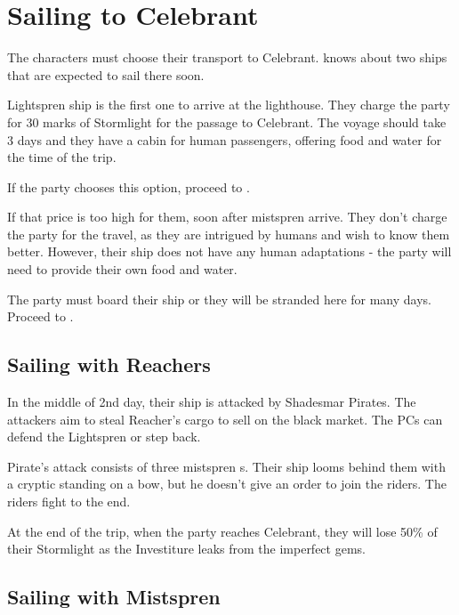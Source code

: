 \section{Sailing to Celebrant}
\label{sec:sailingCelebrant}

The characters must choose their transport to Celebrant. \npcFortuneReader{} knows about two ships that are expected to sail there soon.

Lightspren ship is the first one to arrive at the lighthouse. They charge the party for 30 marks of Stormlight for the passage to Celebrant. The voyage should take 3 days and they have a cabin for human passengers, offering food and water for the time of the trip.

If the party chooses this option, proceed to .

If that price is too high for them, soon after mistspren arrive. They don’t charge the party for the travel, as they are intrigued by humans and wish to know them better. However, their ship does not have any human adaptations - the party will need to provide their own food and water.

The party must board their ship or they will be stranded here for many days. Proceed to .



\subsection{Sailing with Reachers}
\label{ssec:sailingReachers}


In the middle of 2nd day, their ship is attacked by Shadesmar Pirates. The attackers aim to steal Reacher’s cargo to sell on the black market. The PCs can defend the Lightspren or step back.

Pirate's attack consists of three mistspren \enemyMandraRider{}s. Their ship looms behind them with a cryptic standing on a bow, but he doesn't give an order to join the riders. The riders fight to the end.

At the end of the trip, when the party reaches Celebrant, they will lose 50\% of their Stormlight as the Investiture leaks from the imperfect gems.




\subsection{Sailing with Mistspren}
\label{ssec:sailingMistspren}

